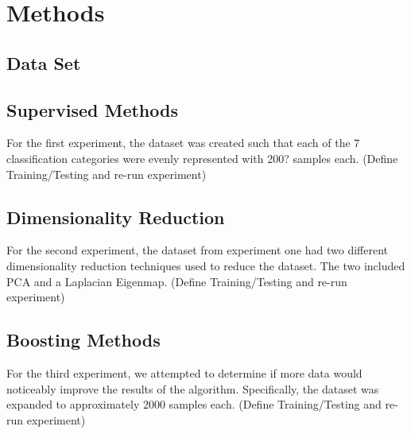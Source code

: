 \section{Methods}
\subsection{Data Set}

\subsection{Supervised Methods}
For the first experiment, the dataset was created such that each of the 7 classification categories were evenly represented with 200? samples each.  (Define Training/Testing and re-run experiment)
\subsection{Dimensionality Reduction}
For the second experiment, the dataset from experiment one had two different dimensionality reduction techniques used to reduce the dataset.  The two included PCA and a Laplacian Eigenmap.  (Define Training/Testing and re-run experiment)
\subsection{Boosting Methods}
For the third experiment, we attempted to determine if more data would noticeably improve the results of the algorithm.  Specifically, the dataset was expanded to approximately 2000 samples each. (Define Training/Testing and re-run experiment)